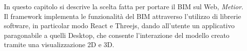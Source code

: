In questo capitolo si descrive la scelta fatta per portare il BIM sul Web, \emph{Metior}.
Il framework implementa le funzionalità del BIM attraverso l'utilizzo di librerie software,
in particolar modo React e Threejs, dando all'utente un applicativo paragonabile a quelli
Desktop, che consente l'interazione del modello creato tramite una visualizzazione 2D e 3D.
